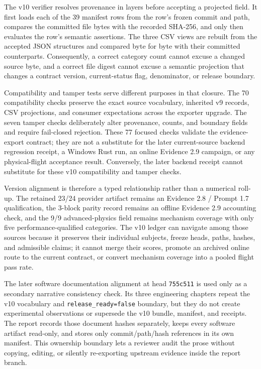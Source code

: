 The v10 verifier resolves provenance in layers before accepting a projected
field. It first loads each of the 39 manifest rows from the row's frozen commit
and path, compares the committed file bytes with the recorded SHA-256, and only
then evaluates the row's semantic assertions. The three CSV views are rebuilt
from the accepted JSON structures and compared byte for byte with their
committed counterparts. Consequently, a correct category count cannot excuse
a changed source byte, and a correct file digest cannot excuse a semantic
projection that changes a contract version, current-status flag, denominator,
or release boundary.

Compatibility and tamper tests serve different purposes in that closure. The
70 compatibility checks preserve the exact source vocabulary, inherited v9
records, CSV projections, and consumer expectations across the exporter
upgrade. The seven tamper checks deliberately alter provenance, counts, and
boundary fields and require fail-closed rejection. These 77 focused checks
validate the evidence-export contract; they are not a substitute for the
later current-source backend regression receipt, a Windows Rust run, an online
Evidence 2.9 campaign, or any physical-flight acceptance result. Conversely,
the later backend receipt cannot substitute for these v10 compatibility and
tamper checks.

Version alignment is therefore a typed relationship rather than a numerical
roll-up. The retained 23/24 provider artifact remains an Evidence 2.8 /
Prompt 1.7 qualification, the 3-block parity record remains an offline
Evidence 2.9 accounting check, and the 9/9 advanced-physics field remains
mechanism coverage with only five performance-qualified categories. The v10
ledger can navigate among those sources because it preserves their individual
subjects, freeze heads, paths, hashes, and admissible claims; it cannot merge
their scores, promote an archived online route to the current contract, or
convert mechanism coverage into a pooled flight pass rate.

The later software documentation alignment at head \texttt{755c511} is used
only as a secondary narrative consistency check. Its three engineering
chapters repeat the v10 vocabulary and \texttt{release\_ready=false} boundary,
but they do not create experimental observations or supersede the v10 bundle,
manifest, and receipts. The report records those document hashes separately,
keeps every software artifact read-only, and stores only commit/path/hash
references in its own manifest. This ownership boundary lets a reviewer audit
the prose without copying, editing, or silently re-exporting upstream evidence
inside the report branch.

